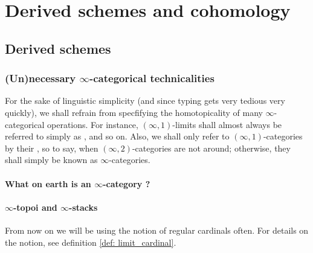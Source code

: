 \chapter{Derived schemes and cohomology}
    \begin{abstract}
        
    \end{abstract}
    
    \minitoc

    \section{Derived schemes}
        \subsection{(Un)necessary \texorpdfstring{$\infty$}{}-categorical technicalities}
            \begin{convention}
                For the sake of linguistic simplicity (and since typing \say{$\infty$} gets very tedious very quickly), we shall refrain from specfifying the homotopicality of many $\infty$-categorical operations. For instance, $(\infty, 1)$-limits shall almost always be referred to simply as , and so on. Also, we shall only refer to $(\infty, 1)$-categories by their , so to say, when $(\infty, 2)$-categories are not around; otherwise, they shall simply be known as $\infty$-categories.
            \end{convention}
            
            \subsubsection{What on earth is an \texorpdfstring{$\infty$}{}-category ?}
        
            \subsubsection{\texorpdfstring{$\infty$}{}-topoi and \texorpdfstring{$\infty$}{}-stacks}
                \begin{remark}
                    From now on we will be using the notion of regular cardinals often. For details on the notion, see definition \ref{def: limit_cardinal}.
                \end{remark}
            
